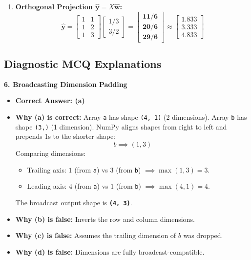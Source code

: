 \begin{enumerate}
\begin{align*}
    \end{align*}
    \item \textbf{Orthogonal Projection $\hat{\mathbf{y}} = X \hat{\mathbf{w}}$:}
    \begin{equation*}
    \hat{\mathbf{y}} = \begin{bmatrix} 1 & 1 \\ 1 & 2 \\ 1 & 3 \end{bmatrix} \begin{bmatrix} 1/3 \\ 3/2 \end{bmatrix} = \mathbf{\begin{bmatrix} 11/6 \\ 20/6 \\ 29/6 \end{bmatrix}} \approx \mathbf{\begin{bmatrix} 1.833 \\ 3.333 \\ 4.833 \end{bmatrix}}
    \end{equation*}
\end{enumerate}

\subsection*{Diagnostic MCQ Explanations}

\textbf{6. Broadcasting Dimension Padding}
\begin{itemize}
    \item \textbf{Correct Answer: (a)}
    \item \textbf{Why (a) is correct:}
    Array \texttt{a} has shape \texttt{(4, 1)} (2 dimensions).
    Array \texttt{b} has shape \texttt{(3,)} (1 dimension).
    NumPy aligns shapes from right to left and prepends 1s to the shorter shape:
    \begin{equation*}
    b \implies (1, 3)
    \end{equation*}
    Comparing dimensions:
    \begin{itemize}
        \item Trailing axis: $1$ (from \texttt{a}) vs $3$ (from \texttt{b}) $\implies \max(1, 3) = 3$.
        \item Leading axis: $4$ (from \texttt{a}) vs $1$ (from \texttt{b}) $\implies \max(4, 1) = 4$.
    \end{itemize}
    The broadcast output shape is \textbf{\texttt{(4, 3)}}.
    \item \textbf{Why (b) is false:} Inverts the row and column dimensions.
    \item \textbf{Why (c) is false:} Assumes the trailing dimension of $b$ was dropped.
    \item \textbf{Why (d) is false:} Dimensions are fully broadcast-compatible.
\end{itemize}

